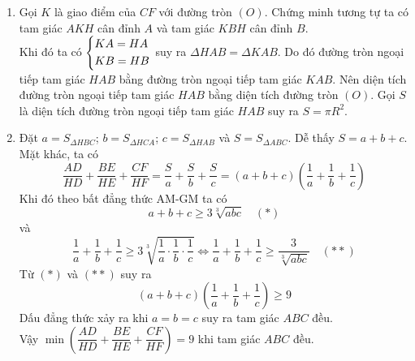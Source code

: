 \begin{ex}
{\begin{enumerate}
	Nhân theo vế các đẳng thức $(6)$, $(7)$, $(8)$ ta được
	$$AE\cdot CD\cdot BF =  AF\cdot BD\cdot CE = DE\cdot EF\cdot FD.$$
	\item Gọi $K$ là giao điểm của $CF$ với đường tròn $\left(O\right)$. Chứng minh tương tự ta có tam giác $AKH$ cân đỉnh $A$ và tam giác $KBH$ cân đỉnh $B$.\\ Khi đó  ta có $\left\{\begin{aligned}&KA = HA\\&KB = HB\end{aligned}\right.$ suy ra $\Delta HAB = \Delta KAB$. Do đó đường tròn ngoại tiếp tam giác $HAB$ bằng đường tròn ngoại tiếp tam giác $KAB$. Nên diện tích đường tròn ngoại tiếp tam giác $HAB$ bằng diện tích đường tròn $\left(O\right)$. Gọi $S$ là diện tích đường tròn ngoại tiếp tam giác $HAB$ suy ra $S = \pi R^2$.
	\item Đặt $a = S_{\Delta HBC}$; $b = S_{\Delta HCA}$; $c = S_{\Delta HAB}$ và $S = S_{\Delta ABC}$. Dễ thấy $S = a + b + c$.\\
Mặt khác, ta có
$$\dfrac{AD}{HD} + \dfrac{BE}{HE} + \dfrac{CF}{HF} = \dfrac{S}{a} + \dfrac{S}{b} + \dfrac{S}{c} = \left(a + b + c\right)\left(\dfrac{1}{a} + \dfrac{1}{b} + \dfrac{1}{c}\right)$$
Khi đó theo bất đẳng thức AM-GM ta có
$$a + b + c\geq 3\sqrt[3]{abc}\quad (*)$$
và 
$$\dfrac{1}{a} + \dfrac{1}{b} + \dfrac{1}{c}\geq 3\sqrt[3]{\dfrac{1}{a}\cdot \dfrac{1}{b}\cdot\dfrac{1}{c}}\Leftrightarrow \dfrac{1}{a} + \dfrac{1}{b} + \dfrac{1}{c}\geq \dfrac{3}{\sqrt[3]{abc}}\quad (**)$$
Từ $(*)$ và $(**)$ suy ra 
$$ \left(a + b + c\right)\left(\dfrac{1}{a} + \dfrac{1}{b} + \dfrac{1}{c}\right)\geq 9$$
Dấu đẳng thức xảy ra khi $a = b = c$ suy ra tam giác $ABC$ đều.\\
Vậy $\min\left(\dfrac{AD}{HD} + \dfrac{BE}{HE} + \dfrac{CF}{HF}\right) = 9$ khi tam giác $ABC$ đều.
\end{enumerate}

		
		
		
	}
\end{ex}


